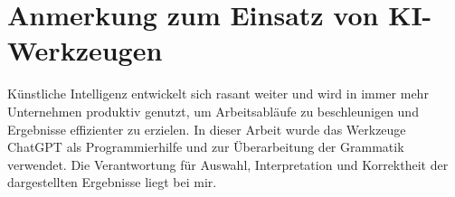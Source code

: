 
\chapter*{Anmerkung zum Einsatz von KI-Werkzeugen}

Künstliche Intelligenz entwickelt sich rasant weiter und wird in immer mehr Unternehmen produktiv genutzt, um Arbeitsabläufe zu beschleunigen und Ergebnisse effizienter zu erzielen. 
In dieser Arbeit wurde das Werkzeuge ChatGPT als Programmierhilfe und zur Überarbeitung der Grammatik verwendet. 
Die Verantwortung für Auswahl, Interpretation und Korrektheit der dargestellten Ergebnisse liegt bei mir.